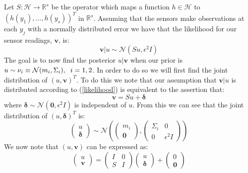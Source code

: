 Let $S:\mathcal{H}\rightarrow\mathbb{R}^{s}$ be the operator which maps a function $h\in\mathcal{H}$ to $(h(y_1),\dots,h(y_s))^{T}$ in $\mathbb{R}^{s}$. Assuming that the sensors make observations at each $y_j$ with a normally distributed error we have that the likelihood for our sensor readings, $\mathbf{v}$, is:
\begin{equation}
  \label{likelihood}
  \mathbf{v}|u \sim \mathcal{N}(Su,\epsilon^{2}I)
\end{equation}
The goal is to now find the posterior $u|\mathbf{v}$ when our prior is $u\sim\nu_{i}\equiv\mathcal{N}(m_{i},\Sigma_{i}), \hspace{0.2cm} i=1,2$. In order to do so we will first find the joint distribution of $(u,\mathbf{v})^{T}$. To do this we note that our assumption that $\mathbf{v}|u$ is distributed according to (\ref{likelihood}) is equivalent to the assertion that:
\begin{equation*}
  \mathbf{v}=Su+\boldsymbol{\delta}
\end{equation*}
where $\boldsymbol{\delta}\sim\mathcal{N}(\mathbf{0},\epsilon^{2}I)$ is independent of $u$. From this we can see that the joint distribution of $(u,\boldsymbol{\delta})^{T}$ is:
\begin{equation*}
  \begin{pmatrix}
    u \\
    \boldsymbol{\delta}
  \end{pmatrix}\sim\mathcal{N}\left(\begin{pmatrix}
                                    m_{i} \\
                                    \mathbf{0}
                                    \end{pmatrix},
                                    \begin{pmatrix}
                                      \Sigma_{i} & 0 \\
                                      0 & \epsilon^{2}I
                                    \end{pmatrix}
                              \right)
\end{equation*}
We now note that $(u,\mathbf{v})$ can be expressed as:
\begin{equation*}
  \begin{pmatrix}
    u \\
    \mathbf{v}
  \end{pmatrix}=\begin{pmatrix}
                  I & 0 \\
                  S & I
                \end{pmatrix}\begin{pmatrix}
                              u \\
                              \boldsymbol{\delta}
                             \end{pmatrix} +
                             \begin{pmatrix}
                                0 \\ \mathbf{0}
                             \end{pmatrix}
\end{equation*}
